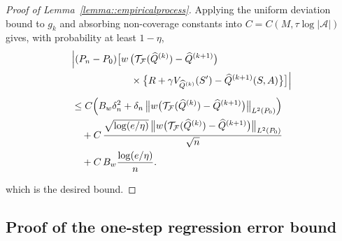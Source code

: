 \documentclass{article}
\theoremstyle{plain}
\theoremstyle{definition}
\theoremstyle{remark}
\begin{document}
\begin{proof}[Proof of Lemma~\ref{lemma::empiricalprocess}]
Applying the uniform deviation bound to $g_k$
and absorbing non-coverage constants into
\(C=C(M,\tau\log|\mathcal A|)\) gives, with probability at least $1-\eta$,
\begin{align*}
&\Bigl|
  (P_n - P_0)\big[
    w\,
    \bigl(
      \mathcal T_{\mathcal F}(\widehat Q^{(k)})
      - \widehat Q^{(k+1)}
    \bigr)
\\
&\hspace{6em}
    \times
    \bigl\{
      R
      + \gamma V_{\widehat Q^{(k)}}(S')
      - \widehat Q^{(k+1)}(S,A)
    \bigr\}
  \big]
\Bigr|
\\[0.4em]
&\le
C\Bigl(
  B_w\delta_n^2
  +
  \delta_n\,
  \bigl\|
    w\bigl(
      \mathcal T_{\mathcal F}(\widehat Q^{(k)})
      - \widehat Q^{(k+1)}
    \bigr)
  \bigr\|_{L^2(P_0)}
\Bigr)
\\
&\quad+
C\,
\frac{
  \sqrt{\log(e/\eta)}\,
  \bigl\|
    w\bigl(
      \mathcal T_{\mathcal F}(\widehat Q^{(k)})
      - \widehat Q^{(k+1)}
    \bigr)
  \bigr\|_{L^2(P_0)}
}{\sqrt n}
\\
&\quad+
C\,B_w\frac{\log(e/\eta)}{n}.
\end{align*}


which is the desired bound.
\end{proof}

\subsection{Proof of the one-step regression error bound}
\end{document}
